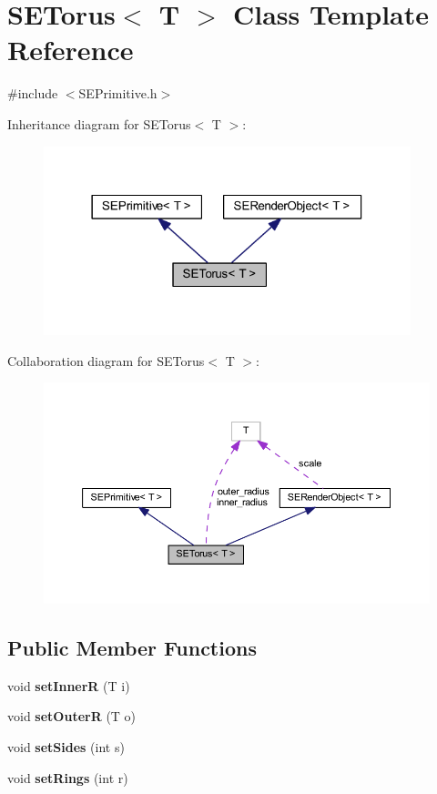 \section{S\+E\+Torus$<$ T $>$ Class Template Reference}
\label{class_s_e_torus}


{\ttfamily \#include $<$S\+E\+Primitive.\+h$>$}



Inheritance diagram for S\+E\+Torus$<$ T $>$\+:
\nopagebreak
\begin{figure}[H]
\begin{center}
\leavevmode
\includegraphics[width=302pt]{class_s_e_torus__inherit__graph}
\end{center}
\end{figure}


Collaboration diagram for S\+E\+Torus$<$ T $>$\+:
\nopagebreak
\begin{figure}[H]
\begin{center}
\leavevmode
\includegraphics[width=350pt]{class_s_e_torus__coll__graph}
\end{center}
\end{figure}
\subsection*{Public Member Functions}
\begin{DoxyCompactItemize}
\item 
void {\bf set\+Inner\+R} (T i)
\item 
void {\bf set\+Outer\+R} (T o)
\item 
void {\bf set\+Sides} (int s)
\item 
void {\bf set\+Rings} (int r)
\end{DoxyCompactItemize}

